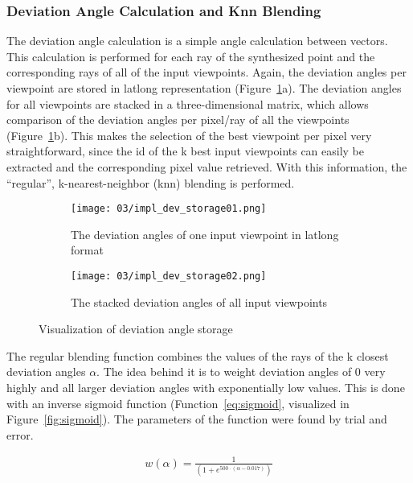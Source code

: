 \subsubsection{Deviation Angle Calculation and Knn Blending}
The deviation angle calculation is a simple angle calculation between vectors. This calculation is performed for each ray of the synthesized point and the corresponding rays of all of the input viewpoints.
Again, the deviation angles per viewpoint are stored in latlong representation (Figure~\ref{fig:dev_angle_storage}a). The deviation angles for all viewpoints are stacked in a three-dimensional matrix, which allows comparison of the deviation angles per pixel/ray of all the viewpoints (Figure~\ref{fig:dev_angle_storage}b). This makes the selection of the best viewpoint per pixel very straightforward, since the id of the k best input viewpoints can easily be extracted and the corresponding pixel value retrieved. With this information, the ``regular'', k-nearest-neighbor (knn) blending is performed.

\begin{figure}
\centering
    \hfill
    \begin{subfigure}[t]{0.4\textwidth}
            \centering
            \texttt{[image: 03/impl\_dev\_storage01.png]}
            \caption{The deviation angles of one input viewpoint in latlong format}
    \end{subfigure}%
    \hfill
    \begin{subfigure}[t]{0.4\textwidth}
            \centering
            \texttt{[image: 03/impl\_dev\_storage02.png]}
            \caption{The stacked deviation angles of all input viewpoints}
    \end{subfigure}
    \hfill
  \caption{Visualization of deviation angle storage} \label{fig:dev_angle_storage}
\end{figure}

The regular blending function combines the values of the rays of the k closest deviation angles $\alpha$. The idea behind it is to weight deviation angles of 0 very highly and all larger deviation angles with exponentially low values. This is done with an inverse sigmoid function (Function~\ref{eq:sigmoid}, visualized in Figure~\ref{fig:sigmoid}). The parameters of the function were found by trial and error.

\begin{align}
  w(\alpha) = \frac{1}{(1 + e^{500\cdot(\alpha - 0.017)})} \label{eq:sigmoid}
\end{align}

